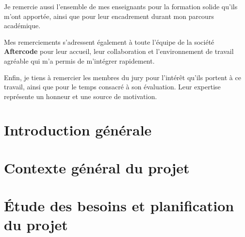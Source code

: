 \documentclass[a4paper, oneside, 12pt, final]{extreport}
\begin{document}
\vspace{0.5cm}

Je remercie aussi l’ensemble de mes enseignants pour la formation solide qu’ils m’ont apportée, ainsi que pour leur encadrement durant mon parcours académique.

\vspace{0.5cm}

Mes remerciements s’adressent également à toute l’équipe de la société \textbf{Aftercode} pour leur accueil, leur collaboration et l’environnement de travail agréable qui m’a permis de m’intégrer rapidement.

\vspace{0.5cm}

Enfin, je tiens à remercier les membres du jury pour l’intérêt qu’ils portent à ce travail, ainsi que pour le temps consacré à son évaluation. Leur expertise représente un honneur et une source de motivation.

\vspace{1cm}






 



\tableofcontents

\listoffigures
\listoftables

\cleardoublepage

\newpage
{}
\chapter*{Introduction générale}
\label{chap:general_intorduction}



\chapter{Contexte général du projet}%
\label{chap:chapterone}


\chapter{Étude des besoins et planification du projet}
\label{chap:2}

\end{document}
